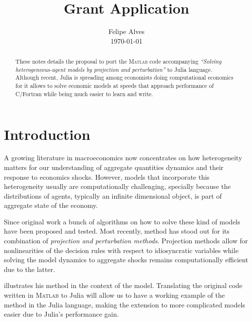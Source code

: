 \documentclass[paper=a4, fontsize=11pt, twosided]{article}  %
\title{ Grant Application}
\author{
        \normalfont \normalsize Felipe Alves \\[-5pt]  \normalsize
        \today
         }
\date{  }
\numberwithin{equation}{section}        %
\numberwithin{figure}{section}          %
\numberwithin{table}{section}               %
\theoremstyle{plain}
\begin{document}
\maketitle
\begin{abstract}
   These notes details the proposal to port the \textsc{Matlab} code accompanying \citet{reiter}
   \emph{``Solving heterogeneous-agent models by projection and perturbation''} to Julia language. Although
   recent, Julia is spreading among economists doing computational economics for it allows to solve
   economic models at speeds that approach performance of C/Fortran while being much easier to learn and write.
\end{abstract}

\section{Introduction} %
\label{sec:introduction}

A growing literature in macroeconomics now concentrates on how heterogeneity matters for our
understanding of aggregate quantities dynamics and their response to economics shocks.
However, models that incorporate this heterogeneity usually are computationally challenging, specially
because the distributions of agents, typically an infinite dimensional object, is part of aggregate state of the economy.

Since \citet{krusellsmith} original work a bunch of algorithms on how to solve these kind of models
have been proposed and tested.
Most recently, \citet{reiter} method has stood out for its combination of \emph{projection and perturbation methods}.
Projection methods allow for nonlinearities of the decision rules with respect to idiosyncratic variables while
solving the model dynamics to aggregate shocks remains computationally efficient due to the latter.

\citet{reiter} illustrates his method in the context of the \citet{krusellsmith} model.
Translating the original code written in \textsc{Matlab} to Julia will allow us to have a working example of
the method in the Julia language, making the extension to more complicated models easier due to Julia's performance
gain.

\end{document}

